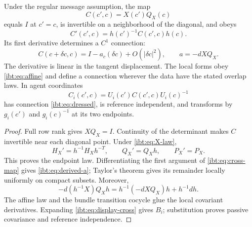 Under the regular message assumption, the map
\begin{equation}
 C(c',c)=X(c')Q_X(c)
 \label{ibt:eq:cross-map}
\end{equation}
equals $I$ at $c'=c$, is invertible on a neighborhood of the diagonal, and obeys
\begin{equation}
 C'(c',c)=h(c')^{-1}C(c',c)h(c).
 \label{ibt:eq:cross-endpoint}
\end{equation}
Its first derivative determines a $C^1$ connection:
\begin{equation}
 C(c+\delta c,c)=I-a_c(\delta c)+O(|\delta c|^2),\qquad
 a=-d X Q_X.
 \label{ibt:eq:derived-a}
\end{equation}
The derivative is linear in the tangent displacement. The local forms obey \cref{ibt:eq:affine} and define a connection wherever the data have the stated overlap laws. In agent coordinates
\begin{equation}
 C_i(c',c)=U_i(c')C(c',c)U_i(c)^{-1}
 \label{ibt:eq:display-cross}
\end{equation}
has connection \cref{ibt:eq:dressed}, is reference independent, and transforms by $g_i(c')$ and $g_i(c)^{-1}$ at its two endpoints.
\begin{proof}
Full row rank gives $XQ_X=I$. Continuity of the determinant makes $C$ invertible near each diagonal point. Under \cref{ibt:eq:X-law},
\begin{equation}
 H_X'=h^{-1}H_Xh^{-T},\qquad Q_X'=Q_Xh,\qquad P_X'=P_X.
\end{equation}
This proves the endpoint law. Differentiating the first argument of \cref{ibt:eq:cross-map} gives \cref{ibt:eq:derived-a}; Taylor's theorem gives its remainder locally uniformly on compact subsets. Moreover,
\begin{equation}
 -d(h^{-1}X)Q_Xh=h^{-1}(-d XQ_X)h+h^{-1}d h.
\end{equation}
The affine law and the bundle transition cocycle glue the local covariant derivatives. Expanding \cref{ibt:eq:display-cross} gives $B_i$; substitution proves passive covariance and reference independence.
\end{proof}

